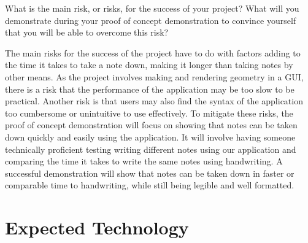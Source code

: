 \documentclass{article}
\begin{document}
What is the main risk, or risks, for the success of your project?  What will you
demonstrate during your proof of concept demonstration to convince yourself that
you will be able to overcome this risk?

The main risks for the success of the project have to do with factors adding to the time it takes to take a note down, making it longer than
taking notes by other means. As the project involves making and rendering geometry in a GUI, there is a risk that the performance of the 
application may be too slow to be practical. Another risk is that users may also find the syntax of the application too cumbersome or 
unintuitive to use effectively. To mitigate these risks, the proof of concept demonstration will focus on showing that notes can be taken 
down quickly and easily using the application. It will involve having someone technically proficient testing writing different notes using our 
application and comparing the time it takes to write the same notes using handwriting. A successful demonstration will show that notes can be 
taken down in faster or comparable time to handwriting, while still being legible and well formatted.

\section{Expected Technology}



\end{document}
